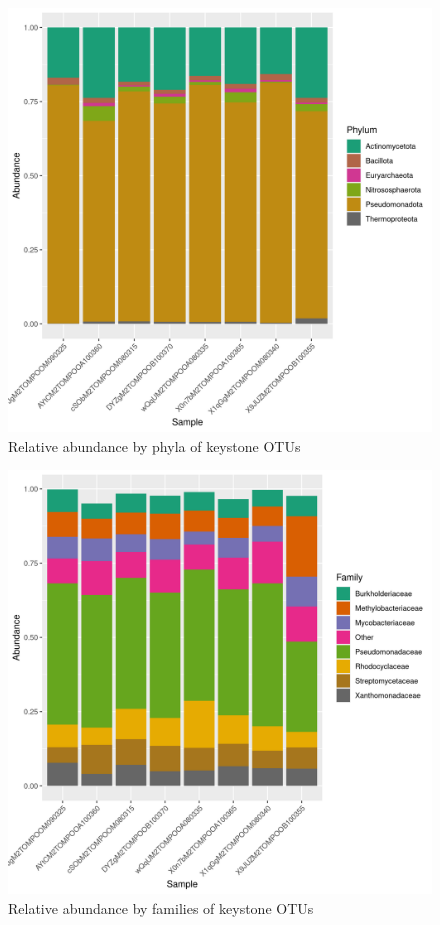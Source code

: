 \begin{figure}
\centering
\includegraphics[scale = 0.8]{tomate_no_desarrollo.csv_relative_abundance_Phylum.png}
\caption{Relative abundance by phyla of keystone OTUs }
\label{fig:tomate_no_desarrollo.csv_phyla}
\end{figure}
\begin{figure}
\centering
\includegraphics[scale = 0.8]{tomate_no_desarrollo.csv_relative_abundance_Family.png}
\caption{Relative abundance by families of keystone OTUs }
\label{fig:tomate_no_desarrollo.csv_family}
\end{figure}

